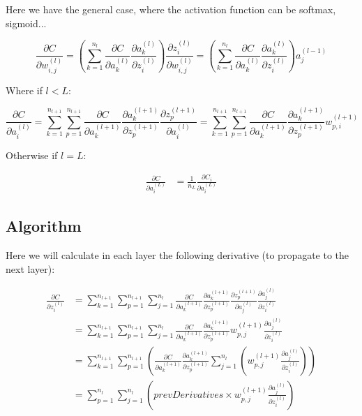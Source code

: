 \documentclass[11pt,a4paper]{report}
\begin{document}
Here we have the general case, where the activation function can be softmax, sigmoid...

\begin{equation*}
    \frac{\partial C}{\partial w_{i,j}^{(l)}} = \left(\sum\limits_{k=1}^{n_{l}}\frac{\partial C}{\partial a_k^{(l)}} \frac{\partial a_k^{(l)}}{\partial z_i^{(l)}}\right) \frac{\partial z_i^{(l)}}{\partial w_{i,j}^{(l)}} = \left(\sum\limits_{k=1}^{n_{l}}\frac{\partial C}{\partial a_k^{(l)}} \frac{\partial a_k^{(l)}}{\partial z_i^{(l)}}\right) a_j^{(l-1)}
\end{equation*}

Where if $l<L$:

\begin{equation*}
    \frac{\partial C}{\partial a_i^{(l)}} = \sum\limits_{k=1}^{n_{l+1}}\sum\limits_{p=1}^{n_{l+1}}\frac{\partial C}{\partial a_k^{(l+1)}} \frac{\partial a_k^{(l+1)}}{\partial z_p^{(l+1)}} \frac{\partial z_p^{(l+1)}}{\partial a_i^{(l)}} = \sum\limits_{k=1}^{n_{l+1}}\sum\limits_{p=1}^{n_{l+1}}\frac{\partial C}{\partial a_k^{(l+1)}} \frac{\partial a_k^{(l+1)}}{\partial z_p^{(l+1)}} w_{p,i}^{(l+1)}
\end{equation*}

Otherwise if $l=L$:

\begin{equation*}
\begin{split}
    \frac{\partial C}{\partial a_i^{(L)}} &= \frac{1}{n_{L}}\frac{\partial C_i}{\partial a_i^{(L)}}
\end{split}
\end{equation*}

\subsection{Algorithm}

Here we will calculate in each layer the following derivative (to propagate to the next layer):

\begin{equation*}
\begin{split}
    \frac{\partial C}{\partial z_i^{(l)}} &= \sum\limits_{k=1}^{n_{l+1}}\sum\limits_{p=1}^{n_{l+1}}\sum\limits_{j=1}^{n_{l}}\frac{\partial C}{\partial a_k^{(l+1)}} \frac{\partial a_k^{(l+1)}}{\partial z_p^{(l+1)}} \frac{\partial z_p^{(l+1)}}{\partial a_j^{(l)}} \frac{\partial a_j^{(l)}}{\partial z_i^{(l)}}\\
    &= \sum\limits_{k=1}^{n_{l+1}}\sum\limits_{p=1}^{n_{l+1}}\sum\limits_{j=1}^{n_{l}}\frac{\partial C}{\partial a_k^{(l+1)}} \frac{\partial a_k^{(l+1)}}{\partial z_p^{(l+1)}} w_{p,j}^{(l+1)}\frac{\partial a_j^{(l)}}{\partial z_i^{(l)}}\\
    &= \sum\limits_{k=1}^{n_{l+1}}\sum\limits_{p=1}^{n_{l+1}}\left(\frac{\partial C}{\partial a_k^{(l+1)}} \frac{\partial a_k^{(l+1)}}{\partial z_p^{(l+1)}} \sum\limits_{j=1}^{n_{l}}\left(w_{p,j}^{(l+1)}\frac{\partial a_j^{(l)}}{\partial z_i^{(l)}}\right)\right)\\
    &= \sum\limits_{p=1}^{n_{l}}\sum\limits_{j=1}^{n_{l}}\left(prevDerivatives \times w_{p,j}^{(l+1)}\frac{\partial a_j^{(l)}}{\partial z_i^{(l)}}\right)
\end{split}
\end{equation*}
\end{document}
